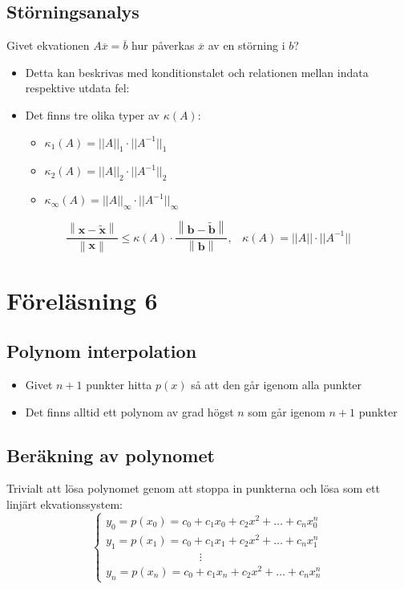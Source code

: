 \documentclass[a4paper,11pt]{article}
\begin{document}
\subsection{Störningsanalys}
Givet ekvationen $A\overline{x} = \overline{b}$ hur påverkas $\overline{x}$ av en störning i $b$?
\begin{itemize}
    \item Detta kan beskrivas med konditionstalet och relationen mellan indata respektive utdata fel:
    \item Det finns tre olika typer av $\kappa(A)$:
    \begin{itemize}
        \item $\kappa_1(A) = ||A||_1 \cdot ||A^{-1}||_1$
        \item $\kappa_2(A) = ||A||_2 \cdot ||A^{-1}||_2$
        \item $\kappa_{\infty}(A) = ||A||_{\infty} \cdot ||A^{-1}||_{\infty}$
    \end{itemize}
\end{itemize}

\[
\frac{\left\|\mathbf{x} - \tilde{\mathbf{x}}\right\|}{\left\|\mathbf{x}\right\|} \leq \kappa(A) \cdot \frac{\left\|\mathbf{b} - \tilde{\mathbf{b}}\right\|}{\left\|\mathbf{b}\right\|}, \hspace{10pt} \kappa(A) = ||A|| \cdot ||A^{-1}||
\]

\section{Föreläsning 6}
\subsection{Polynom interpolation}
\begin{itemize}
    \item Givet $n+1$ punkter hitta $p(x)$ så att den går igenom alla punkter
    \item Det finns alltid ett polynom av grad högst $n$ som går igenom $n+1$ punkter
\end{itemize}

\subsection{Beräkning av polynomet}
Trivialt att lösa polynomet genom att stoppa in punkterna och lösa som ett linjärt ekvationssystem:
\[
\begin{cases}
    y_0 = p(x_0) = c_0 + c_1 x_0 + c_2 x^2 + \hdots + c_n x_0^n \\
    y_1 = p(x_1) = c_0 + c_1 x_1 + c_2 x^2 + \hdots + c_n x_1^n \\
    \hspace{100pt} \vdots \\
    y_n = p(x_n) = c_0 + c_1 x_n + c_2 x^2 + \hdots + c_n x_n^n
\end{cases}
\]
\end{document}
